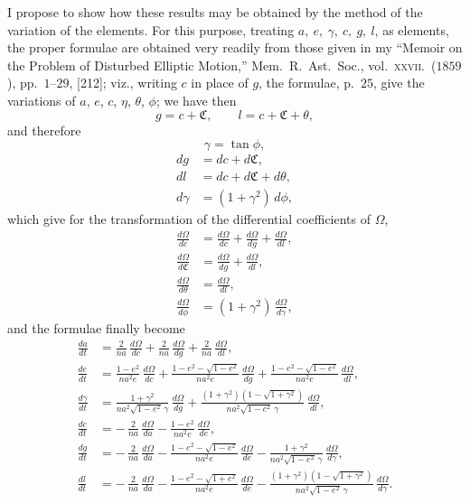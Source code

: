 \documentclass[11pt]{article}
\begin{document}
I propose to show how these results may be obtained by the method of
the variation of the elements. For this purpose, treating $a,\ e,\ \gamma,\ c,\ g,\ l$,
as elements, the proper formulae are obtained very readily from those
given in my ``Memoir on the Problem of Disturbed Elliptic Motion,''
Mem.\ R.\ Ast.\ Soc., vol.\ \textsc{xxvii}.\ ($1859$), pp.\ $1$--$29$,
[212]; viz., writing $c$ in place of $g$, the formulae, p.\ $25$,
give the variations of $a$, $e$, $c$, $\eta$, $\theta$, $\phi$; we
have then
\[
g = c + \mathfrak{C}, \qquad
l = c + \mathfrak{C} + \theta,
\]
and therefore
\[
\gamma = \tan \phi,
\]
\begin{align*}
dg &= dc + d\mathfrak{C}, \\
dl &= dc + d\mathfrak{C} + d\theta, \\
d\gamma &= (1 + \gamma^{2})\,d\phi,
\end{align*}
which give for the transformation of the differential coefficients of
$\Omega$,
\begin{align*}
\frac{d\Omega}{dc} &= \frac{d\Omega}{dc} + \frac{d\Omega}{dg} + \frac{d\Omega}{dl}, \\
\frac{d\Omega}{d\mathfrak{C}} &= \frac{d\Omega}{dg} + \frac{d\Omega}{dl}, \\
\frac{d\Omega}{d\theta} &= \frac{d\Omega}{dl}, \\
\frac{d\Omega}{d\phi} &= (1+\gamma^{2})\,\frac{d\Omega}{d\gamma},
\end{align*}
and the formulae finally become
\begin{align*}
\frac{da}{dt} &= \frac{2}{na}\,\frac{d\Omega}{dc}
   + \frac{2}{na}\,\frac{d\Omega}{dg}
   + \frac{2}{na}\,\frac{d\Omega}{dl}, \\[2pt]
\frac{de}{dt} &= \frac{1 - e^{2}}{na^{2}e}\,\frac{d\Omega}{dc}
   + \frac{1 - e^{2} - \sqrt{1 - e^{2}}}{na^{2}e}\,\frac{d\Omega}{dg}
   + \frac{1 - e^{2} - \sqrt{1 - e^{2}}}{na^{2}e}\,\frac{d\Omega}{dl}, \\[2pt]
\frac{d\gamma}{dt} &= \frac{1 + \gamma^{2}}{na^{2}\sqrt{1 - e^{2}}\,\gamma}\,\frac{d\Omega}{dg}
   + \frac{(1+\gamma^{2})(1 - \sqrt{1 + \gamma^{2}})}{na^{2}\sqrt{1 - e^{2}}\,\gamma}\,\frac{d\Omega}{dl}, \\[2pt]
\frac{dc}{dt} &= -\,\frac{2}{na}\,\frac{d\Omega}{da}
   - \frac{1 - e^{2}}{na^{2}e}\,\frac{d\Omega}{de}, \\[2pt]
\frac{dg}{dt} &= -\,\frac{2}{na}\,\frac{d\Omega}{da}
   - \frac{1 - e^{2} - \sqrt{1 - e^{2}}}{na^{2}e}\,\frac{d\Omega}{de}
   - \frac{1 + \gamma^{2}}{na^{2}\sqrt{1 - e^{2}}\,\gamma}\,\frac{d\Omega}{d\gamma}, \\[2pt]
\frac{dl}{dt} &= -\,\frac{2}{na}\,\frac{d\Omega}{da}
   - \frac{1 - e^{2} - \sqrt{1 + e^{2}}}{na^{2}e}\,\frac{d\Omega}{de}
   - \frac{(1+\gamma^{2})(1 - \sqrt{1 + \gamma^{2}})}{na^{2}\sqrt{1 - e^{2}}\,\gamma}\,\frac{d\Omega}{d\gamma}.
\end{align*}
\end{document}
